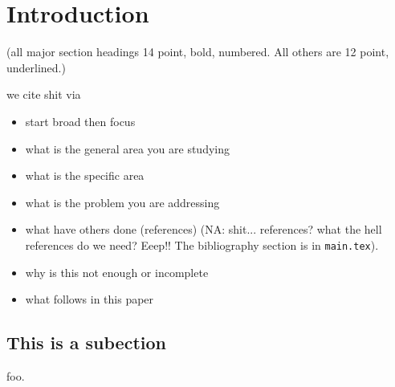 \section{Introduction} \label{sec:Introduction}

(all major section headings 14 point, bold, numbered.  All others are 12 point, underlined.)

we cite shit via\cite{Anders}

\begin{itemize}
  \item
    start broad then focus
  \item
    what is the general area you are studying 
  \item
    what is the specific area 
  \item
    what is the problem you are addressing
  \item
    what have others done (references) (NA: shit... references? what the
    hell references do we need? Eeep!! The bibliography section is in
    \texttt{main.tex}).
  \item
    why is this not enough or incomplete
  \item
    what follows in this paper
\end{itemize}

\subsection{This is a subection}
foo.
